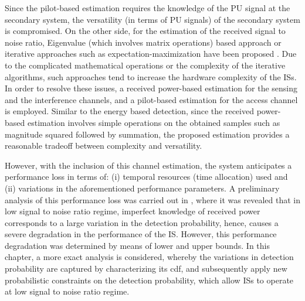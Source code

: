 Since the pilot-based estimation requires the knowledge of the PU signal at the secondary system, the versatility (in terms of PU signals) of the secondary system is compromised. On the other side, for the estimation of the received signal to noise ratio, Eigenvalue (which involves matrix operations) based approach \cite{Sharma13} or iterative approaches such as expectation-maximization have been proposed \cite{Chav11}. Due to the complicated mathematical operations or the complexity of the iterative algorithms, such approaches tend to increase the hardware complexity of the ISs. In order to resolve these issues, a received power-based estimation for the sensing and the interference channels, and a pilot-based estimation for the access channel is employed. Similar to the energy based detection, since the received power-based estimation involves simple operations on the obtained samples such as magnitude squared followed by summation, the proposed estimation provides a reasonable tradeoff between complexity and versatility. %

However, with the inclusion of this channel estimation, the system anticipates a performance loss in terms of: (i) temporal resources (time allocation) used and (ii) variations in the aforementioned performance parameters. A preliminary analysis of this performance loss was carried out in \cite{Kaushik15_CC}, where it was revealed that in low signal to noise ratio regime, imperfect knowledge of received power corresponds to a large variation in the detection probability, hence, causes a severe degradation in the performance of the IS. However, this performance degradation was determined by means of lower and upper bounds. In this chapter, a more exact analysis is considered, whereby the variations in detection probability are captured by characterizing its cdf, and subsequently apply new probabilistic constraints on the detection probability, which allow ISs to operate at low signal to noise ratio regime. %

